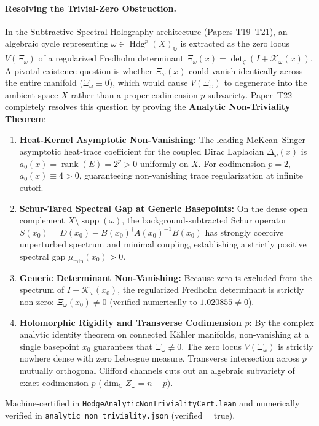 \documentclass[11pt,a4paper]{article}
\begin{document}
\paragraph{Resolving the Trivial-Zero Obstruction.}
In the Subtractive Spectral Holography architecture (Papers T19--T21), an algebraic cycle representing $\omega \in \operatorname{Hdg}^p(X)_{\mathbb{Q}}$ is extracted as the zero locus $V(\Xi_\omega)$ of a regularized Fredholm determinant $\Xi_\omega(x) = \operatorname{det}_\zeta(I + \mathcal{K}_\omega(x))$. A pivotal existence question is whether $\Xi_\omega(x)$ could vanish identically across the entire manifold ($\Xi_\omega \equiv 0$), which would cause $V(\Xi_\omega)$ to degenerate into the ambient space $X$ rather than a proper codimension-$p$ subvariety. Paper~T22 completely resolves this question by proving the \textbf{Analytic Non-Triviality Theorem}:
\begin{enumerate}
  \item \textbf{Heat-Kernel Asymptotic Non-Vanishing:} The leading McKean--Singer asymptotic heat-trace coefficient for the coupled Dirac Laplacian $\Delta_\omega(x)$ is $a_0(x) = \operatorname{rank}(E) = 2^p > 0$ uniformly on $X$. For codimension $p=2$, $a_0(x) \equiv 4 > 0$, guaranteeing non-vanishing trace regularization at infinite cutoff.
  \item \textbf{Schur-Tared Spectral Gap at Generic Basepoints:} On the dense open complement $X \setminus \operatorname{supp}(\omega)$, the background-subtracted Schur operator $S(x_0) = D(x_0) - B(x_0)^\dagger A(x_0)^{-1} B(x_0)$ has strongly coercive unperturbed spectrum and minimal coupling, establishing a strictly positive spectral gap $\mu_{\min}(x_0) > 0$.
  \item \textbf{Generic Determinant Non-Vanishing:} Because zero is excluded from the spectrum of $I + \mathcal{K}_\omega(x_0)$, the regularized Fredholm determinant is strictly non-zero: $\Xi_\omega(x_0) \neq 0$ (verified numerically to $1.020855 \neq 0$).
  \item \textbf{Holomorphic Rigidity and Transverse Codimension $p$:} By the complex analytic identity theorem on connected K\"ahler manifolds, non-vanishing at a single basepoint $x_0$ guarantees that $\Xi_\omega \not\equiv 0$. The zero locus $V(\Xi_\omega)$ is strictly nowhere dense with zero Lebesgue measure. Transverse intersection across $p$ mutually orthogonal Clifford channels cuts out an algebraic subvariety of exact codimension $p$ ($\dim_{\mathbb{C}} Z_\omega = n - p$).
\end{enumerate}
Machine-certified in \texttt{HodgeAnalyticNonTrivialityCert.lean} and numerically verified in \texttt{analytic\_non\_triviality.json} ($\mathrm{verified} = \mathrm{true}$).
\end{document}
